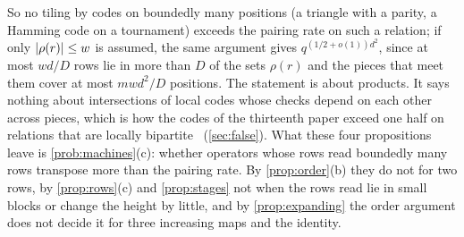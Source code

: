 So no tiling by codes on boundedly many positions (a triangle with a parity, a Hamming code on a tournament) exceeds
the pairing rate on such a relation; if only $\lvert \rho(r) \rvert\le w$ is assumed, the same argument gives
$q^{(1/2+o(1))d^2}$, since at most $wd/D$ rows lie in more than $D$ of the sets $\rho(r)$ and the pieces that
meet them cover at most $mwd^2/D$ positions. The statement is about products. It says nothing about intersections
of local codes whose checks depend on each other across pieces, which is how the codes of the thirteenth
paper exceed one half on relations that are locally bipartite~\cite{StorageCodes2026} (\cref{sec:false}). What these four
propositions leave is \cref{prob:machines}(c): whether operators whose rows read boundedly many rows transpose more
than the pairing rate. By \cref{prop:order}(b) they do not for two rows, by \cref{prop:rows}(c) and
\cref{prop:stages} not when the rows read lie in small blocks or change the height by little, and by
\cref{prop:expanding} the order argument does not decide it for three increasing maps and the identity.

